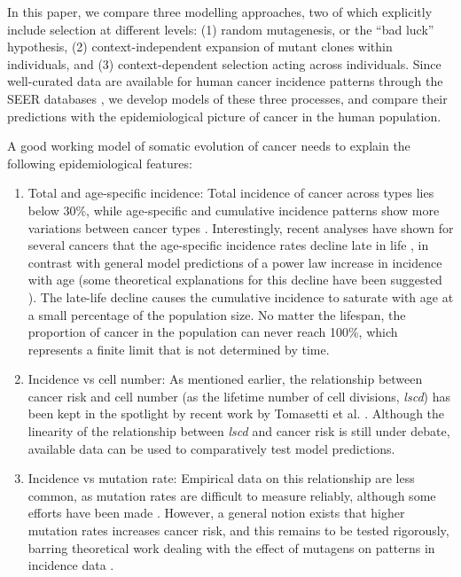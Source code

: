 \documentclass[10pt,twocolumn,twoside]{article}
\begin{document}
In this paper, we compare three modelling approaches, two of which explicitly include selection at different levels: (1) random mutagenesis, or the ``bad luck'' hypothesis, (2) context-independent expansion of mutant clones within individuals, and (3) context-dependent selection acting across individuals. Since well-curated data are available for human cancer incidence patterns through the SEER databases \cite{AmericanCancerSociety2016}, we develop models of these three processes, and compare their predictions with the epidemiological picture of cancer in the human population.

A good working model of somatic evolution of cancer needs to explain the following epidemiological features:

\begin{enumerate}
	\item Total and age-specific incidence: Total incidence of cancer across types lies below 30\%, while age-specific and cumulative incidence patterns show more variations between cancer types \cite{AmericanCancerSociety2016}. Interestingly, recent analyses have shown for several cancers that the age-specific incidence rates decline late in life \cite{Harding2012}, in contrast with general model predictions of a power law increase in incidence with age (some theoretical explanations for this decline have been suggested \cite{Frank2007}). The late-life decline causes the cumulative incidence to saturate with age at a small percentage of the population size. No matter the lifespan, the proportion of cancer in the population can never reach 100\%, which represents a finite limit that is not determined by time.
	\item Incidence vs cell number: As mentioned earlier, the relationship between cancer risk and cell number (as the lifetime number of cell divisions, \textit{lscd}) has been kept in the spotlight by recent work by Tomasetti et al. \cite{Tomasetti78, Tomasetti2017}. Although the linearity of the relationship between \textit{lscd} and cancer risk is still under debate, available data can be used to comparatively test model predictions.
	\item Incidence vs mutation rate: Empirical data on this relationship are less common, as mutation rates are difficult to measure reliably, although some efforts have been made \cite{Hao2016}. However, a general notion exists that higher mutation rates increases cancer risk, and this remains to be tested rigorously, barring theoretical work dealing with the effect of mutagens on patterns in incidence data \cite{Frank2007}.

\end{enumerate}
\end{document}
